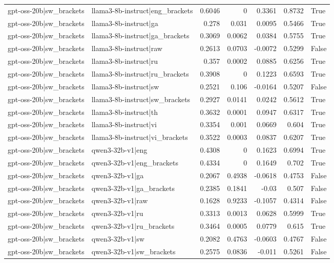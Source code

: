 \begin{table}
\begin{tabular}{l l r r r r l}
gpt-oss-20b|sw_brackets & llama3-8b-instruct|eng_brackets & 0.6046 & 0 & 0.3361 & 0.8732 & True \\
gpt-oss-20b|sw_brackets & llama3-8b-instruct|ga & 0.278 & 0.031 & 0.0095 & 0.5466 & True \\
gpt-oss-20b|sw_brackets & llama3-8b-instruct|ga_brackets & 0.3069 & 0.0062 & 0.0384 & 0.5755 & True \\
gpt-oss-20b|sw_brackets & llama3-8b-instruct|raw & 0.2613 & 0.0703 & -0.0072 & 0.5299 & False \\
gpt-oss-20b|sw_brackets & llama3-8b-instruct|ru & 0.357 & 0.0002 & 0.0885 & 0.6256 & True \\
gpt-oss-20b|sw_brackets & llama3-8b-instruct|ru_brackets & 0.3908 & 0 & 0.1223 & 0.6593 & True \\
gpt-oss-20b|sw_brackets & llama3-8b-instruct|sw & 0.2521 & 0.106 & -0.0164 & 0.5207 & False \\
gpt-oss-20b|sw_brackets & llama3-8b-instruct|sw_brackets & 0.2927 & 0.0141 & 0.0242 & 0.5612 & True \\
gpt-oss-20b|sw_brackets & llama3-8b-instruct|th & 0.3632 & 0.0001 & 0.0947 & 0.6317 & True \\
gpt-oss-20b|sw_brackets & llama3-8b-instruct|vi & 0.3354 & 0.001 & 0.0669 & 0.604 & True \\
gpt-oss-20b|sw_brackets & llama3-8b-instruct|vi_brackets & 0.3522 & 0.0003 & 0.0837 & 0.6207 & True \\
gpt-oss-20b|sw_brackets & qwen3-32b-v1|eng & 0.4308 & 0 & 0.1623 & 0.6994 & True \\
gpt-oss-20b|sw_brackets & qwen3-32b-v1|eng_brackets & 0.4334 & 0 & 0.1649 & 0.702 & True \\
gpt-oss-20b|sw_brackets & qwen3-32b-v1|ga & 0.2067 & 0.4938 & -0.0618 & 0.4753 & False \\
gpt-oss-20b|sw_brackets & qwen3-32b-v1|ga_brackets & 0.2385 & 0.1841 & -0.03 & 0.507 & False \\
gpt-oss-20b|sw_brackets & qwen3-32b-v1|raw & 0.1628 & 0.9233 & -0.1057 & 0.4314 & False \\
gpt-oss-20b|sw_brackets & qwen3-32b-v1|ru & 0.3313 & 0.0013 & 0.0628 & 0.5999 & True \\
gpt-oss-20b|sw_brackets & qwen3-32b-v1|ru_brackets & 0.3464 & 0.0005 & 0.0779 & 0.615 & True \\
gpt-oss-20b|sw_brackets & qwen3-32b-v1|sw & 0.2082 & 0.4763 & -0.0603 & 0.4767 & False \\
gpt-oss-20b|sw_brackets & qwen3-32b-v1|sw_brackets & 0.2575 & 0.0836 & -0.011 & 0.5261 & False \\

\end{tabular}
\end{table}
